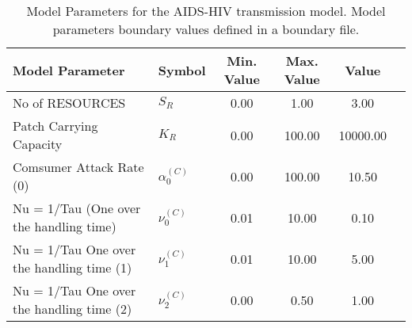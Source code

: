 \begin{table}
\centering
\begin{tabular}{p{5cm}lcccc}
{\bf Model Parameter} & {\bf Symbol} & {\bf Min. Value} & {\bf Max. Value} & {\bf Value}\\
\hline\hline
No of RESOURCES & $S_R$ & 0.00 & 1.00 & 3.00\\
Patch Carrying Capacity & $K_R$ & 0.00 & 100.00 & 10000.00\\
Comsumer Attack Rate (0) & $\alpha^{(C)}_0$ & 0.00 & 100.00 & 10.50\\
Nu = 1/Tau (One over the handling time) & $\nu^{(C)}_0$ & 0.01 & 10.00 & 0.10\\
 Nu = 1/Tau	 One over the handling time (1) & $\nu^{(C)}_1$ & 0.01 & 10.00 & 5.00\\
 Nu = 1/Tau	 One over the handling time (2) & $\nu^{(C)}_2$ & 0.00 & 0.50 & 1.00\\
\hline\hline
\end{tabular}
\caption{Model Parameters for the AIDS-HIV transmission model. Model parameters boundary values defined in a boundary file.}
\end{table}
